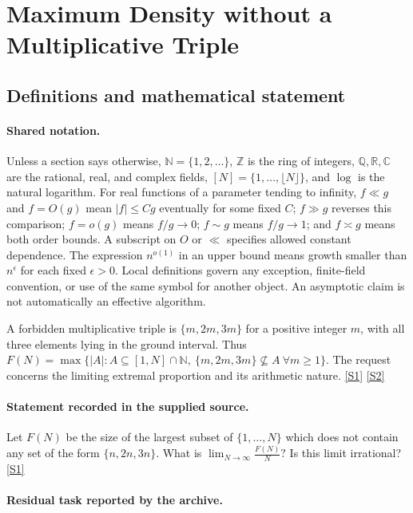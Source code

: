 \documentclass[11pt,a4paper]{article}
\newcommand{\N}{\mathbb{N}}
\newcommand{\Z}{\mathbb{Z}}
\newcommand{\Q}{\mathbb{Q}}
\newcommand{\R}{\mathbb{R}}
\newcommand{\C}{\mathbb{C}}
\newcommand{\sref}[2]{\hyperlink{source:#1:#2}{[S#2]}}
\begin{document}
\section{Maximum Density without a Multiplicative Triple}\label{statement}


\subsection{Definitions and mathematical statement}

\paragraph{Shared notation.}Unless a section says otherwise, $\N=\{1,2,\ldots\}$,
$\Z$ is the ring of integers, $\Q,\R,\C$ are the rational, real, and complex
fields, $[N]=\{1,\ldots,\lfloor N\rfloor\}$, and $\log$ is the natural
logarithm. For real functions of a parameter tending to infinity,
$f\ll g$ and $f=O(g)$ mean $|f|\leq Cg$ eventually for some fixed $C$;
$f\gg g$ reverses this comparison; $f=o(g)$ means $f/g\to0$;
$f\sim g$ means $f/g\to1$; and $f\asymp g$ means both order bounds.
A subscript on $O$ or $\ll$ specifies allowed constant dependence.
The expression $n^{o(1)}$ in an upper bound means growth smaller than
$n^\epsilon$ for each fixed $\epsilon>0$. Local definitions govern any
exception, finite-field convention, or use of the same symbol for another
object. An asymptotic claim is not automatically an effective algorithm.



A forbidden multiplicative triple is $\{m,2m,3m\}$ for a positive integer $m$, with all three elements lying in the ground interval. Thus $F(N)=\max\{|A|:A\subseteq[1,N]\cap\N,\ \{m,2m,3m\}\nsubseteq A\ \forall m\geq1\}$. The request concerns the limiting extremal proportion and its arithmetic nature. \sref{statement}{1} \sref{statement}{2}

\paragraph{Statement recorded in the supplied source.}
Let $F(N)$ be the size of the largest subset of $\{1,\ldots,N\}$ which does not contain any set of the form $\{n,2n,3n\}$. What is $  \lim_{N\to \infty}\frac{F(N)}{N}? $ Is this limit irrational? \sref{statement}{1}

\paragraph{Residual task reported by the archive.}
\end{document}
